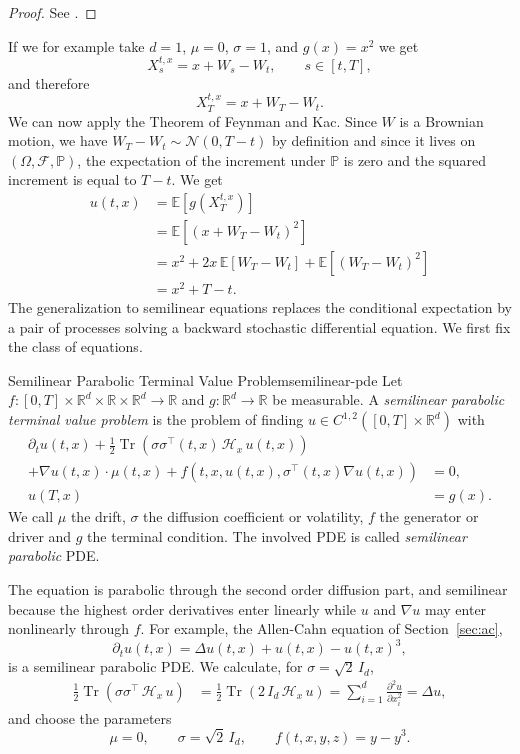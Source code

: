 ﻿\documentclass[10pt,a4paper]{article}
\begin{document}
\begin{proof}
    See \cite[Chapter~8]{Oksendal2003}.
\end{proof}
If we for example take $d=1$, $\mu=0$, $\sigma=1$, and $g(x)=x^2$ we get
\[
X_s^{t,x}=x+W_s-W_t,
\qquad s\in[t,T],
\]
and therefore
\[
X_T^{t,x}=x+W_T-W_t.
\]
We can now apply the Theorem of Feynman and Kac. Since $W$ is a Brownian motion, we have $W_T-W_t\sim\mathcal N(0,T-t)$ by definition and since it lives on $(\Omega, \mathcal{F,} \mathbb{P})$, the expectation of the increment under $\mathbb{P}$ is zero and the squared increment is equal to $T-t$. We get
\begin{align*}
u(t,x)
&=\mathbb E\!\left[g\!\left(X_T^{t,x}\right)\right] \\
&=\mathbb E\!\left[(x+W_T-W_t)^2\right] \\
&=x^2
  +2x\,\mathbb E[W_T-W_t]
  +\mathbb E\!\left[(W_T-W_t)^2\right] \\
&=x^2+T-t.
\end{align*}
The generalization to semilinear equations replaces the conditional expectation by a pair of processes solving a backward stochastic differential equation. We first fix the class of equations.
\begin{definition}{Semilinear Parabolic Terminal Value Problem}{semilinear-pde}
Let $f\colon[0,T]\times\mathbb R^d\times\mathbb R\times\mathbb R^d
\to\mathbb R$ and $g\colon\mathbb R^d\to\mathbb R$ be measurable. A
\emph{semilinear parabolic terminal value problem} is the problem of
finding $u\in C^{1,2}([0,T]\times\mathbb R^d)$ with
\begin{align*}
\partial_t u(t,x)
+ \tfrac12 \operatorname{Tr}\!\left(\sigma\sigma^{\top}(t,x)\,
  \mathcal{H}_x\, u(t,x)\right) & \\
+ \nabla u(t,x)\cdot\mu(t,x)
+ f\!\left(t,x,u(t,x),\sigma^{\top}(t,x)\nabla u(t,x)\right) &= 0,\\
u(T,x) &= g(x).
\end{align*}
We call $\mu$ the drift, $\sigma$ the diffusion coefficient or volatility, $f$ the generator or driver and $g$ the terminal condition. The involved PDE is called \textit{semilinear parabolic} PDE.
\end{definition}
The equation is parabolic through the second order diffusion part, and semilinear because the highest order derivatives enter linearly while $u$ and $\nabla u$ may enter nonlinearly through $f$. For example, the Allen-Cahn equation of Section~\ref{sec:ac},
\[
\partial_t u(t,x) = \Delta u(t,x) + u(t,x) - u(t,x)^3,
\]
is a semilinear parabolic PDE. We calculate, for $\sigma = \sqrt{2}\,I_d$,
\begin{align*}
\tfrac12\operatorname{Tr}\!\left(\sigma\sigma^{\top}\,
\mathcal{H}_x\, u\right)
&= \tfrac12\operatorname{Tr}\!\left(2\,I_d\,
\mathcal{H}_x\, u\right)
= \sum_{i=1}^{d}\frac{\partial^2 u}{\partial x_i^2}
= \Delta u,
\end{align*} 
and choose the parameters
\begin{equation*}
\mu = 0,
\qquad
\sigma = \sqrt{2}\,I_d,
\qquad
f(t,x,y,z) = y - y^3.
\end{equation*}
\end{document}
